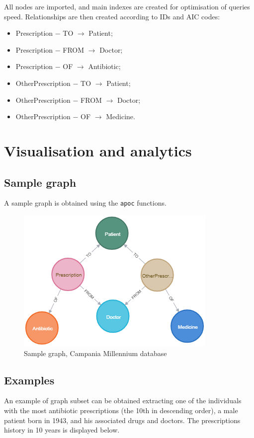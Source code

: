 All nodes are imported, and main indexes are created for optimisation of queries speed. Relationships are then created according to IDs and AIC codes:
\begin{itemize}
	\item Prescription $-$ TO $\rightarrow$ Patient;
	\item Prescription $-$ FROM $\rightarrow$ Doctor;
	\item Prescription $-$ OF $\rightarrow$ Antibiotic;
	\item OtherPrescription $-$ TO $\rightarrow$ Patient;
	\item OtherPrescription $-$ FROM $\rightarrow$ Doctor;
	\item OtherPrescription $-$ OF $\rightarrow$ Medicine.
\end{itemize}

\section{Visualisation and analytics}
\subsection{Sample graph}
A sample graph is obtained using the \texttt{apoc} functions.

\begin{figure}[h]
	\centering
	\includegraphics[scale=0.5]{./images/sample-graph.png}
	\caption{\small Sample graph, Campania Millennium database}
\end{figure}

\subsection{Examples}
An example of graph subset can be obtained extracting one of the individuals with the most antibiotic prescriptions (the 10th in descending order), a male patient born in 1943, and his associated drugs and doctors. The prescriptions history in 10 years is displayed below.

